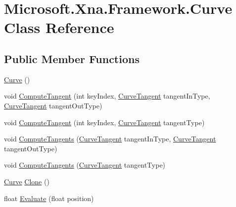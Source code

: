 \hypertarget{class_microsoft_1_1_xna_1_1_framework_1_1_curve}{\section{Microsoft.\+Xna.\+Framework.\+Curve Class Reference}
\label{class_microsoft_1_1_xna_1_1_framework_1_1_curve}
}
\subsection*{Public Member Functions}
\begin{DoxyCompactItemize}
\item 
\hyperlink{class_microsoft_1_1_xna_1_1_framework_1_1_curve_a6711a5d077092907f6edcb40e5157fbf}{Curve} ()
\item 
void \hyperlink{class_microsoft_1_1_xna_1_1_framework_1_1_curve_a33f71f660f6a4e78b75d13bac2b01846}{Compute\+Tangent} (int key\+Index, \hyperlink{namespace_microsoft_1_1_xna_1_1_framework_a37eb63dcaa40d88c5b3a4d73cd70c38c}{Curve\+Tangent} tangent\+In\+Type, \hyperlink{namespace_microsoft_1_1_xna_1_1_framework_a37eb63dcaa40d88c5b3a4d73cd70c38c}{Curve\+Tangent} tangent\+Out\+Type)
\item 
void \hyperlink{class_microsoft_1_1_xna_1_1_framework_1_1_curve_ad3caf0ce601024fd23338596d30eabee}{Compute\+Tangent} (int key\+Index, \hyperlink{namespace_microsoft_1_1_xna_1_1_framework_a37eb63dcaa40d88c5b3a4d73cd70c38c}{Curve\+Tangent} tangent\+Type)
\item 
void \hyperlink{class_microsoft_1_1_xna_1_1_framework_1_1_curve_ae9a585b9eca6c8b11dd165fd2bfb8eaf}{Compute\+Tangents} (\hyperlink{namespace_microsoft_1_1_xna_1_1_framework_a37eb63dcaa40d88c5b3a4d73cd70c38c}{Curve\+Tangent} tangent\+In\+Type, \hyperlink{namespace_microsoft_1_1_xna_1_1_framework_a37eb63dcaa40d88c5b3a4d73cd70c38c}{Curve\+Tangent} tangent\+Out\+Type)
\item 
void \hyperlink{class_microsoft_1_1_xna_1_1_framework_1_1_curve_a4977f479ae3d2065ddb3eb89f1d57015}{Compute\+Tangents} (\hyperlink{namespace_microsoft_1_1_xna_1_1_framework_a37eb63dcaa40d88c5b3a4d73cd70c38c}{Curve\+Tangent} tangent\+Type)
\item 
\hyperlink{class_microsoft_1_1_xna_1_1_framework_1_1_curve}{Curve} \hyperlink{class_microsoft_1_1_xna_1_1_framework_1_1_curve_a0eb95c1ec4aed1eb2bf7efc23050b163}{Clone} ()
\item 
float \hyperlink{class_microsoft_1_1_xna_1_1_framework_1_1_curve_abc1a60066381d7126550814a9d0c0d69}{Evaluate} (float position)
\end{DoxyCompactItemize}
